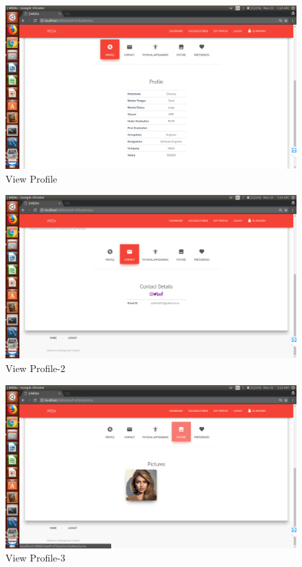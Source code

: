 \documentclass[12pt]{report}
\begin{document}
\begin{figure}[!htb]
    \centering
    \includegraphics[width=1\textwidth]{sc-12.png}
    \caption{View Profile}
    \label{fig:View Profile}
\end{figure}

\begin{figure}[!htb]
    \centering
    \includegraphics[width=1\textwidth]{sc-13.png}
    \caption{View Profile-2}
    \label{fig:View Profile-2}
\end{figure}

\begin{figure}[!htb]
    \centering
    \includegraphics[width=1\textwidth]{sc-14.png}
    \caption{View Profile-3}
    \label{fig:View Profile-3}
\end{figure}
\end{document}
